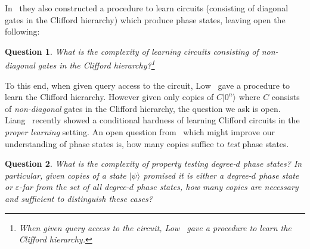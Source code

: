 \documentclass[11pt]{article}
\newcommand{\Exp}{\mathbb{E}}
\newcommand{\Sh}{\ensuremath{\mathcal{S}}}
\newcommand{\ket}[1]{|#1\rangle}
\newcommand{\FF}{\mathbb{F}}
\newcommand{\ZZ}{\mathbb{Z}}
\newtheorem{question}{Question}
\newcommand{\snote}[1]{\footnote{\textcolor{magenta}{(Srini: #1)}}}
\begin{document}



In~\cite{DBLP:journals/corr/abs-2208-07851} they also constructed a procedure to learn circuits (consisting of diagonal gates in the Clifford hierarchy) which produce phase states, leaving open the following:

\begin{question}
  What is the complexity of learning circuits consisting of \emph{non-diagonal} gates in the Clifford hierarchy?\footnote{When given query access to the circuit, Low~\cite{low2009learning} gave a procedure to learn the Clifford hierarchy.}
\end{question}
To this end, when given query access to the circuit, Low~\cite{low2009learning} gave a procedure to learn the Clifford hierarchy. However given only copies of $C\ket{0^n}$ where $C$ consists of \emph{non-diagonal} gates in the Clifford hierarchy, the question we ask is open.  Liang~\cite{liang2022clifford} recently showed a conditional hardness of learning Clifford circuits in the \emph{proper learning} setting. An open question from~\cite{DBLP:journals/corr/abs-2208-07851} which might improve our understanding of phase states is,  how many copies suffice to \emph{test} phase states.

\begin{question}
What is the complexity of  property testing degree-$d$ phase states? In particular, given copies of a state $\ket{\psi}$ promised it is either a degree-$d$ phase state or $\varepsilon$-far from the set of all degree-$d$ phase states, how many copies are necessary and sufficient to distinguish these cases?
\end{question}
\end{document}
